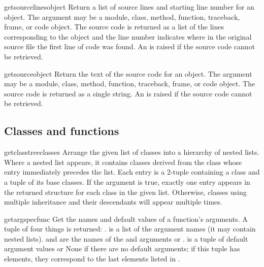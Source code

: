 \begin{funcdesc}{getsourcelines}{object}
  Return a list of source lines and starting line number for an object.
  The argument may be a module, class, method, function, traceback, frame,
  or code object.  The source code is returned as a list of the lines
  corresponding to the object and the line number indicates where in the
  original source file the first line of code was found.  An
   is raised if the source code cannot be retrieved.
\end{funcdesc}

\begin{funcdesc}{getsource}{object}
  Return the text of the source code for an object.
  The argument may be a module, class, method, function, traceback, frame,
  or code object.  The source code is returned as a single string.  An
   is raised if the source code cannot be retrieved.
\end{funcdesc}

\subsection{Classes and functions
            \label{inspect-classes-functions}}

\begin{funcdesc}{getclasstree}{classes}
  Arrange the given list of classes into a hierarchy of nested lists.
  Where a nested list appears, it contains classes derived from the class
  whose entry immediately precedes the list.  Each entry is a 2-tuple
  containing a class and a tuple of its base classes.  If the 
  argument is true, exactly one entry appears in the returned structure
  for each class in the given list.  Otherwise, classes using multiple
  inheritance and their descendants will appear multiple times.
\end{funcdesc}

\begin{funcdesc}{getargspec}{func}
  Get the names and default values of a function's arguments.
  A tuple of four things is returned: .
   is a list of the argument names (it may contain nested lists).
   and  are the names of the \code{*} and
  \code{**} arguments or .
   is a tuple of default argument values or None if there are no
  default arguments; if this tuple has  elements, they correspond to
  the last  elements listed in .
\end{funcdesc}

